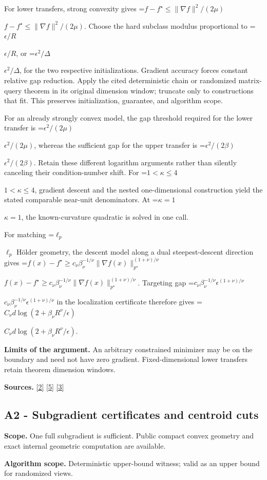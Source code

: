 \documentclass[10pt,a4paper]{article}
\newcommand{\AtlasMath}[1]{\par\begingroup\centering\setbox0=\hbox{$\displaystyle #1$}\ifdim\wd0>1.4\linewidth\typeout{ATLAS WIDE FORMULA: \the\wd0}\fi\ifdim\wd0>\linewidth\resizebox{\linewidth}{!}{\box0}\else\box0\fi\par\endgroup}
\newcommand{\AtlasInlineMath}[1]{\begingroup\setbox0=\hbox{$#1$}\ifdim\wd0>.4\linewidth\endgroup\AtlasMath{#1}\else\endgroup$#1$\fi}
\begin{document}
For lower transfers, strong convexity gives \AtlasInlineMath{f-f^\star\le\|\nabla f\|^2/(2\mu)}. Choose the hard subclass modulus proportional to \AtlasInlineMath{\epsilon/R}, or \AtlasInlineMath{\epsilon^2/\Delta}, for the two respective initializations. Gradient accuracy forces constant relative gap reduction. Apply the cited deterministic chain or randomized matrix-query theorem in its original dimension window; truncate only to constructions that fit. This preserves initialization, guarantee, and algorithm scope.

For an already strongly convex model, the gap threshold required for the lower transfer is \AtlasInlineMath{\epsilon^2/(2\mu)}, whereas the sufficient gap for the upper transfer is \AtlasInlineMath{\epsilon^2/(2\beta)}. Retain these different logarithm arguments rather than silently canceling their condition-number shift. For \AtlasInlineMath{1<\kappa\le4}, gradient descent and the nested one-dimensional construction yield the stated comparable near-unit denominators. At \AtlasInlineMath{\kappa=1}, the known-curvature quadratic is solved in one call.

For matching \AtlasInlineMath{\ell_p} Hölder geometry, the descent model along a dual steepest-descent direction gives
\AtlasInlineMath{f(x)-f^\star\ge c_\nu\beta_\nu^{-1/\nu}\|\nabla f(x)\|_{p^\star}^{(1+\nu)/\nu}}.
Targeting gap \AtlasInlineMath{c_\nu\beta_\nu^{-1/\nu}\epsilon^{(1+\nu)/\nu}} in the localization certificate therefore gives
\AtlasInlineMath{C_\nu d\log(2+\beta_\nu R^\nu/\epsilon)}.

\textbf{Limits of the argument.} An arbitrary constrained minimizer may be on the boundary and need not have zero gradient. Fixed-dimensional lower transfers retain theorem dimension windows.

\textbf{Sources.} \href{https://arxiv.org/pdf/2101.09740v2}{[2]} \href{https://arxiv.org/pdf/2609.33360v2}{[5]} \href{https://arxiv.org/pdf/2609.10874}{[3]}

\subsection{A2 - Subgradient certificates and centroid cuts}
\textbf{Scope.} One full subgradient is sufficient. Public compact convex geometry and exact internal geometric computation are available.

\textbf{Algorithm scope.} Deterministic upper-bound witness; valid as an upper bound for randomized views.
\end{document}
